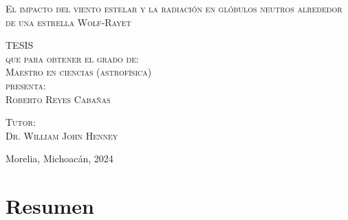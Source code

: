 \documentclass{book}
\begin{document}
\begin{titlepage}
\begin{minipage}[c][0.81\textheight][t]{0.75\textwidth}
\begin{center}
                {\large\scshape El impacto del viento estelar y la radiación en glóbulos neutros alrededor de una estrella Wolf-Rayet}\\[.2in]

                \vspace{2cm}            

                \textsc{\LARGE T\hspace{1.5cm}E\hspace{1.5cm}S\hspace{1.5cm}I\hspace{1.5cm}S}\\[0.5cm]
                \textsc{\large que para obtener el grado de:}\\[0.5cm]
                \textsc{\large Maestro en ciencias (astrofísica)}\\[0.5cm]
                \textsc{\large presenta:}\\[0.5cm]
                \textsc{\large {Roberto Reyes Cabañas}}\\[2cm]          

                \vspace{0.5cm}

                {\large\scshape Tutor:\\[0.3cm] {Dr. William John Henney }}\\ [.2in]

                \vspace{0.5cm}

                \large{Morelia, Michoacán,}{ }{2024}
            \end{center}
        \end{minipage}
    \end{titlepage}


\chapter*{Resumen}
\end{document}
